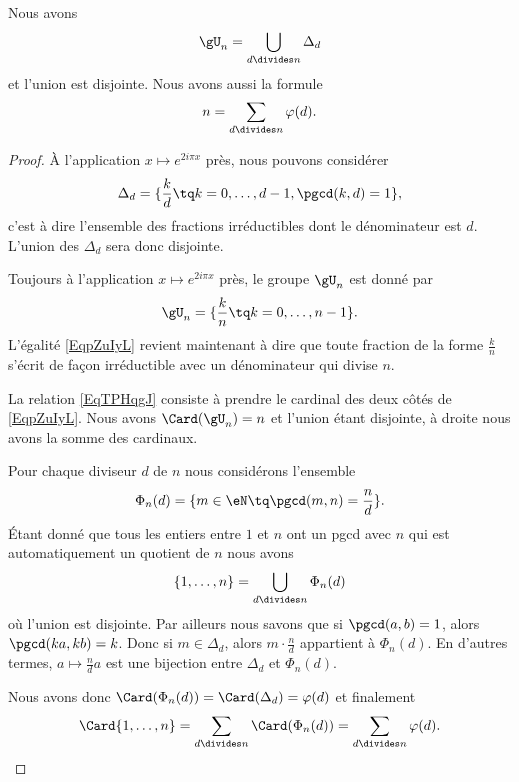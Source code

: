 \begin{lemma}       \label{LemKcpjee}
    Nous avons
    \begin{equation}        \label{EqpZuIyL}
        \gU_n=\bigcup_{d\divides n}\Delta_d
    \end{equation}
    et l'union est disjointe. Nous avons aussi la formule
    \begin{equation}        \label{EqTPHqgJ}
        n=\sum_{d\divides n}\varphi(d).
    \end{equation}
\end{lemma}

\begin{proof}
    À l'application \( x\mapsto  e^{2i\pi x}\) près, nous pouvons considérer
    \begin{equation}
        \Delta_d=\{ \frac{ k }{ d }\tq k=0,\ldots, d-1, \pgcd(k,d)=1 \},
    \end{equation}
    c'est à dire l'ensemble des fractions irréductibles dont le dénominateur est \( d\). L'union des \( \Delta_d\) sera donc disjointe.
    
    Toujours à l'application \( x\mapsto  e^{2i\pi x}\) près, le groupe \( \gU_n\) est donné par
    \begin{equation}
        \gU_n=\{ \frac{ k }{ n }\tq k=0,\ldots, n-1 \}.
    \end{equation}
    L'égalité \eqref{EqpZuIyL} revient maintenant à dire que toute fraction de la forme \( \frac{ k }{ n }\) s'écrit de façon irréductible avec un dénominateur qui divise \( n\).

    La relation \eqref{EqTPHqgJ} consiste à prendre le cardinal des deux côtés de \eqref{EqpZuIyL}. Nous avons \( \Card(\gU_n)=n\) et l'union étant disjointe, à droite nous avons la somme des cardinaux.


    Pour chaque diviseur \( d\) de \( n\) nous considérons l'ensemble
    \begin{equation}
        \Phi_n(d)=\{ m\in \eN\tq \pgcd(m,n)=\frac{ n }{ d } \}.
    \end{equation}
    Étant donné que tous les entiers entre \( 1\) et \( n\) ont un pgcd avec \( n\) qui est automatiquement un quotient de \( n\) nous avons
    \begin{equation}
        \{ 1,\ldots, n \}=\bigcup_{d\divides n}\Phi_n(d)
    \end{equation}
    où l'union est disjointe. Par ailleurs nous savons que si \( \pgcd(a,b)=1\), alors \( \pgcd(ka,kb)=k\). Donc si \( m\in \Delta_d\), alors \( m\cdot \frac{ n }{ d }\) appartient à \( \Phi_n(d)\). En d'autres termes, \( a\mapsto \frac{ n }{ d }a\) est une bijection entre \( \Delta_d\) et \( \Phi_n(d)\).

    Nous avons donc \( \Card(\Phi_n(d))=\Card(\Delta_d)=\varphi(d)\) et finalement
    \begin{equation}
        \Card\{ 1,\ldots, n \}=\sum_{d\divides n}\Card(\Phi_n(d))=\sum_{d\divides n}\varphi(d).
    \end{equation}
\end{proof}

